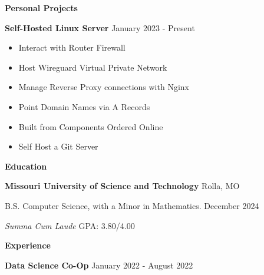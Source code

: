 \documentclass[12pt]{article}
\begin{document}
\begin{center}
    \textbf{Personal Projects}
\end{center}

\textbf{Self-Hosted Linux Server} \hfill January 2023 - Present
\begin{itemize}[noitemsep]
    \item Interact with Router Firewall
    \item Host Wireguard Virtual Private Network
    \item Manage Reverse Proxy connections with Nginx
    \item Point Domain Names via A Records
    \item Built from Components Ordered Online
    \item Self Host a Git Server
\end{itemize}


\begin{center}
    \textbf{Education}
\end{center}
\textbf{Missouri University of Science and Technology} \hfill Rolla, MO

B.S. Computer Science, with a Minor in Mathematics. \hfill December 2024

\textit{Summa Cum Laude} \hfill GPA: 3.80/4.00


\begin{center}
    \textbf{Experience}
\end{center}


\textbf{Data Science Co-Op} \hfill January 2022 - August 2022
\end{document}
